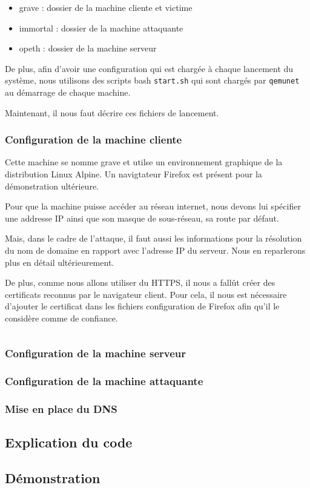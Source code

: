 \begin{itemize}
\item grave : dossier de la machine cliente et victime
\item immortal : dossier de la machine attaquante
\item opeth : dossier de la machine serveur
\end{itemize}

De plus, afin d'avoir une configuration qui est chargée à chaque lancement du système, nous utilisons des scripts bash \verb+start.sh+ qui sont chargés par \verb+qemunet+ au démarrage de chaque machine.

Maintenant, il nous faut décrire ces fichiers de lancement.

\subsubsection{Configuration de la machine cliente}
Cette machine se nomme grave et utilse un environnement graphique de la distribution Linux Alpine. Un navigtateur Firefox est présent pour la démonstration ultérieure.

Pour que la machine puisse accéder au réseau internet, nous devons lui spécifier une addresse IP ainsi que son masque de sous-réseau, sa route par défaut.

Mais, dans le cadre de l'attaque, il faut aussi les informations pour la résolution du nom de domaine en rapport avec l'adresse IP du serveur. Nous en reparlerons plus en détail ultérieurement.

De plus, comme nous allons utiliser du HTTPS, il nous a fallût créer des certificats reconnus par le navigateur client. Pour cela, il nous est nécessaire d'ajouter le certificat dans les fichiers configuration de Firefox afin qu'il le considère comme de confiance.

\inputminted[bgcolor=lbcolor, breaklines]{shell}{../sslstrip2/grave/start.sh}

\subsubsection{Configuration de la machine serveur}

\subsubsection{Configuration de la machine attaquante}

\subsubsection{Mise en place du DNS}

\subsection{Explication du code}

\subsection{Démonstration}
